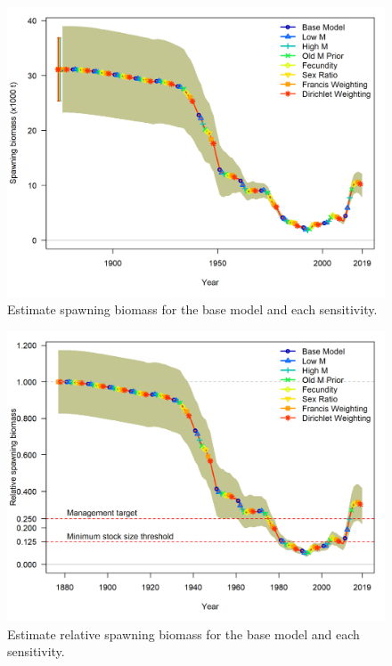 \documentclass[12pt,]{article}
\begin{document}
\FloatBarrier

\begin{figure}
\centering
\includegraphics{Figures/ssb_sens.png}
\caption{Estimate spawning biomass for the base model and each
sensitivity. \label{fig:sens_ssb}}
\end{figure}

\FloatBarrier

\begin{figure}
\centering
\includegraphics{Figures/depl_sens.png}
\caption{Estimate relative spawning biomass for the base model and each
sensitivity. \label{fig:sens_depl}}
\end{figure}
\end{document}
